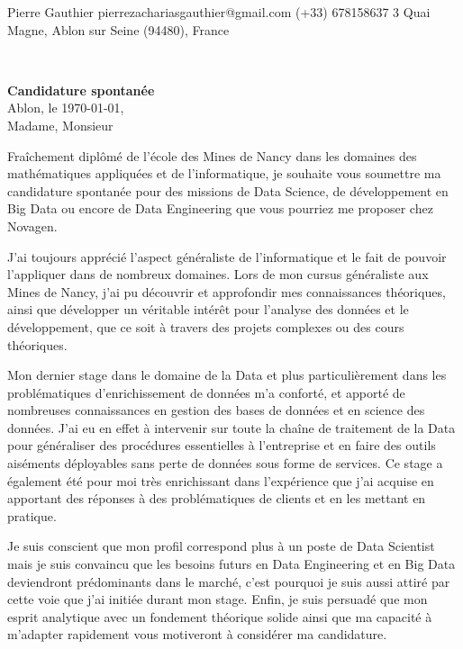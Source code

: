 \documentclass{cv_style}
\begin{document}
    {Pierre Gauthier}
    {{pierrezachariasgauthier@gmail.com}}
    {{(+33) 678158637}}
    {3 Quai Magne, Ablon sur Seine  (94480), France}


%
\vspace{3cm}\\
\begin{flushleft}
    \large
    \textbf{Candidature spontanée} \\ 
    Ablon, le \today, \\[0.5cm]
    Madame, Monsieur
\end{flushleft}
\vspace{0.4cm}
\large
Fraîchement diplômé de l'école des Mines de Nancy dans les domaines des mathématiques appliquées et de l'informatique, je souhaite vous soumettre ma candidature spontanée pour des missions de Data Science, de développement en Big Data ou encore de Data Engineering que vous pourriez me proposer chez Novagen. 
 
J'ai toujours apprécié l'aspect généraliste de l'informatique et le fait de pouvoir l'appliquer dans de nombreux domaines. Lors de mon cursus généraliste aux Mines de Nancy, j'ai pu découvrir et approfondir mes connaissances théoriques, ainsi que développer un véritable intérêt pour l'analyse des données et le développement, que ce soit à travers des projets complexes ou des cours théoriques. 
 
Mon dernier stage dans le domaine de la Data et	 plus particulièrement dans les problématiques d'enrichissement de données m'a conforté, et apporté de nombreuses connaissances en gestion des bases de données et en science des données.  J'ai eu en effet à intervenir sur toute la chaîne de traitement de la Data pour généraliser des procédures  essentielles à l'entreprise et en faire des outils aiséments déployables sans perte de données sous forme de services. Ce stage a également été pour moi très enrichissant dans l'expérience que j'ai acquise en apportant des réponses à des problématiques de clients et en les mettant en pratique.

Je suis conscient que mon profil correspond plus à un poste de Data Scientist mais je suis convaincu que les besoins futurs en Data Engineering et en Big Data deviendront prédominants dans le marché, c'est pourquoi je suis aussi attiré par cette voie que j'ai initiée durant mon stage.
Enfin, je suis persuadé que mon esprit analytique  avec un fondement théorique solide ainsi que ma capacité à m'adapter rapidement vous motiveront à considérer ma candidature.
 
\end{document}
